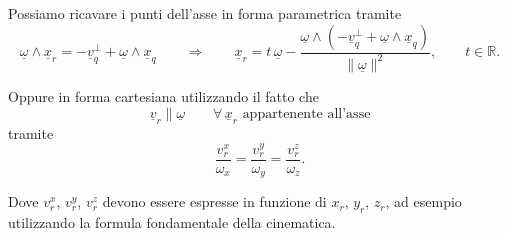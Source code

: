 \begin{oss}{}
    Possiamo ricavare i punti dell'asse in forma parametrica tramite
\[
\underline{\omega}\wedge \underline{x}_r
=
-\underline{v}_q^{\perp}+\underline{\omega}\wedge \underline{x}_q
\qquad \Rightarrow \qquad
\underline{x}_r
=
t\,\underline{\omega}
-
\frac{\underline{\omega}\wedge\left(-\underline{v}_q^{\perp}+\underline{\omega}\wedge \underline{x}_q\right)}{\|\underline{\omega}\|^2},
\qquad t\in\mathbb{R}.
\]

Oppure in forma cartesiana utilizzando il fatto che
\[
\underline{v}_r \parallel \underline{\omega}
\qquad \forall\,\underline{x}_r
\text{ appartenente all'asse}
\]
tramite
\[
\frac{v_r^x}{\omega_x}
=
\frac{v_r^y}{\omega_y}
=
\frac{v_r^z}{\omega_z}.
\]

Dove $v_r^x$, $v_r^y$, $v_r^z$ devono essere espresse in funzione di
$x_r$, $y_r$, $z_r$, ad esempio utilizzando la formula fondamentale della cinematica.
\end{oss}

